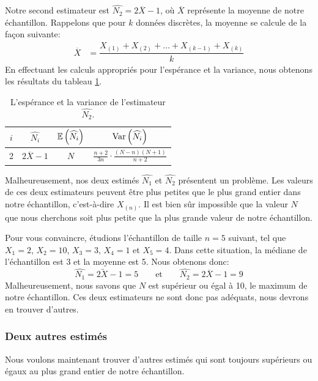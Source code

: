 \documentclass[10pt]{article}
\begin{document}
Notre second estimateur est \(\widehat{N_2}=2\overline{X}-1\), où
\(\overline{X}\) représente la moyenne de notre échantillon. Rappelons
que pour \(k\) données discrètes, la moyenne se calcule de la façon
suivante: \begin{align*}
\overline{X} &= \dfrac{X_{(1)}+X_{(2)}+\ldots +X_{(k-1)}+X_{(k)}}{k}
\end{align*} En effectuant les calculs appropriés pour l'espérance et la
variance, nous obtenons les résultats du tableau
\ref{tab:estimateur_n2}.

\begin{table}[ht]
\begin{center}
\begin{tabular}{|c|c|c|c|}
\hline
$i$ & $\widehat{N_i}$ & $\operatorname{\mathbb{E}}\left(\widehat{N_i}\right)$ & $\operatorname{Var}\left(\widehat{N_i}\right)$ \\
\hline
\hline
2 & $2\overline{X}-1$ & $N$ & $\frac{n+2}{3n}\cdot\frac{(N-n)(N+1)}{n+2}$ \\
\hline
\end{tabular}
\end{center}
\caption{\label{tab:estimateur_n2} {L'espérance et la variance de l'estimateur $\widehat{N_2}$.} }
\end{table}

Malheureusement, nos deux estimés \(\widehat{N_1}\) et \(\widehat{N_2}\)
présentent un problème. Les valeurs de ces deux estimateurs peuvent être
plus petites que le plus grand entier dans notre échantillon,
c'est-à-dire \(X_{(n)}\). Il est bien sûr impossible que la valeur \(N\)
que nous cherchons soit plus petite que la plus grande valeur de notre
échantillon.

Pour vous convaincre, étudions l'échantillon de taille \(n=5\) suivant,
tel que \(X_1=2\), \(X_2=10\), \(X_3=3\), \(X_4=1\) et \(X_5=4\). Dans
cette situation, la médiane de l'échantillon est 3 et la moyenne est 5.
Nous obtenons donc:
\[\widehat{N_1}=2\widetilde{X}-1=5 \qquad \text{et} \qquad \widehat{N_2}=2\overline{X}-1=9 \]
Malheureusement, nous savons que \(N\) est supérieur ou égal à 10, le
maximum de notre échantillon. Ces deux estimateurs ne sont donc pas
adéquats, nous devrons en trouver d'autres.

\hypertarget{deux-autres-estimes}{%
\subsubsection{Deux autres estimés}\label{deux-autres-estimes}}

Nous voulons maintenant trouver d'autres estimés qui sont toujours
supérieurs ou égaux au plus grand entier de notre échantillon.
\end{document}
